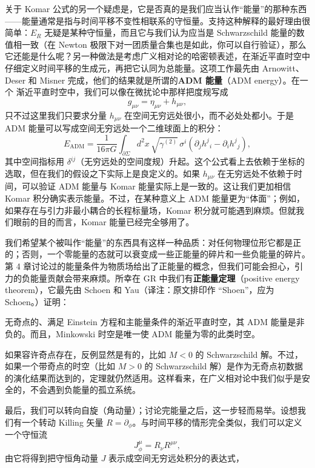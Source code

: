 关于 Komar 公式的另一个疑虑是，它是否真的是我们应当认作“能量”的那种东西——能量通常是指与时间平移不变性相联系的守恒量。支持这种解释的最好理由很简单：$E_{R}$ 无疑是某种守恒量，而且它与我们认为应当是 Schwarzschild 能量的数值相一致（在 Newton 极限下对一团质量合集也是如此，你可以自行验证），那么它还能是什么呢？另一种做法是考虑广义相对论的哈密顿表述，在渐近平直时空中仔细定义时间平移的生成元，再把它认同为总能量。这项工作最先由 Arnowitt、Deser 和 Misner 完成，他们的结果就是所谓的\textbf{ADM 能量}（ADM energy）。在一个
渐近平直时空中，我们可以像在微扰论中那样把度规写成
\begin{equation*}
g_{\mu\nu} = \eta_{\mu\nu} + h_{\mu\nu},
\tag{6.45}
\end{equation*}
只不过这里我们只要求分量 $h_{\mu\nu}$ 在空间无穷远处很小，而不必处处都小。于是 ADM 能量可以写成空间无穷远处一个二维球面上的积分：
\begin{equation*}
E_{\mathrm{ADM}} = \frac{1}{16\pi G}\int_{\partial\Sigma} d^{2}x\,\sqrt{\gamma^{(2)}}\,\sigma^{i}\left(\partial_{j}h^{j}{}_{i}-\partial_{i}h^{j}{}_{j}\right),
\tag{6.46}
\end{equation*}
其中空间指标用 $\delta^{ij}$（无穷远处的空间度规）升起。这个公式看上去依赖于坐标的选取，但在我们的假设之下实际上是良定义的。如果 $h_{\mu\nu}$ 在无穷远处不依赖于时间，可以验证 ADM 能量与 Komar 能量实际上是一致的。这让我们更加相信 Komar 积分确实表示能量。不过，在某种意义上 ADM 能量更为“体面”；例如，如果存在与引力非最小耦合的长程标量场，Komar 积分就可能遇到麻烦。但就我们眼前的目的而言，Komar 能量已经完全够用了。

我们希望某个被叫作“能量”的东西具有这样一种品质：对任何物理位形它都是正的；否则，一个零能量的态就可以衰变成一些正能量的碎片和一些负能量的碎片。第 4 章讨论过的能量条件为物质场给出了正能量的概念，但我们可能会担心，引力的负能量贡献会带来麻烦。所幸在 GR 中我们有\textbf{正能量定理}（positive energy theorem），它最先由 Schoen 和 Yau（译注：原文排印作 “Shoen”，应为 Schoen。）证明：

无奇点的、满足 Einstein 方程和主能量条件的渐近平直时空，其 ADM 能量是非负的。而且，Minkowski 时空是唯一使 ADM 能量为零的此类时空。

如果容许奇点存在，反例显然是有的，比如 $M<0$ 的 Schwarzschild 解。不过，如果一个带奇点的时空（比如 $M>0$ 的 Schwarzschild 解）是作为无奇点初数据的演化结果而达到的，定理就仍然适用。这样看来，在广义相对论中我们似乎是安全的，不会遇到负能量的孤立系统。

最后，我们可以转向自旋（角动量）；讨论完能量之后，这一步轻而易举。设想我们有一个转动 Killing 矢量 $R=\partial_{\phi}$。与时间平移的情形完全类似，我们可以定义一个守恒流
\begin{equation*}
J^{\mu}_{\phi} = R_{\nu}R^{\mu\nu},
\tag{6.47}
\end{equation*}
由它将得到把守恒角动量 $J$ 表示成空间无穷远处积分的表达式，

